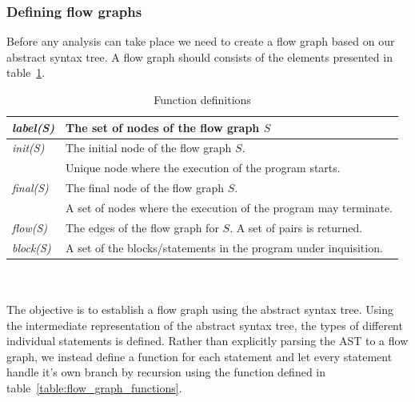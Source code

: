 \subsubsection{Defining flow graphs}\label{section:CreatingFlowGraphs}
Before any analysis can take place we need to create a flow graph based on our abstract syntax tree. A flow graph should consists of the elements presented in table~\ref{table:flow_graph_definitions}.
\begin{table}
    \begin{tabular}{l | l }
    \textsl{label(S)} & The set of nodes of the flow graph $S$ \\
    \hline    
    \textsl{init(S)}  & The initial node of the flow graph $S$.\\
               & Unique node where the execution of the program starts.\\
    \hline
    \textsl{final(S)}   & The final node of the flow graph $S$.\\
                 & A set of nodes where the execution of the program may terminate.\\
    \hline
    \textsl{flow(S)} & The edges of the flow graph for $S$. A set of pairs is returned. \\
	\hline
    \textsl{block(S)}   & A set of the blocks/statements in the program under inquisition.\\
    \end{tabular}
    \centering
	\caption{Function definitions}
	\label{table:flow_graph_definitions}
\end{table}
\\\\
The objective is to establish a flow graph using the abstract syntax tree. Using the intermediate representation of the abstract syntax tree, the types of different individual statements is defined. Rather than explicitly parsing the AST to a flow graph, we instead define a function for each statement and let every statement handle it's own branch by recursion using the function defined in table~\ref{table:flow_graph_functions}.

